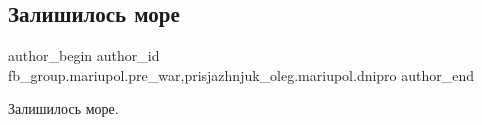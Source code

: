 
 
 
 
 

\subsection{Залишилось море}
\label{sec:16_03_2023.fb.fb_group.mariupol.pre_war.3.zalyshylos_more}
 
\ifcmt
 author_begin
   author_id fb_group.mariupol.pre_war,prisjazhnjuk_oleg.mariupol.dnipro
 author_end
\fi

Залишилось море.

